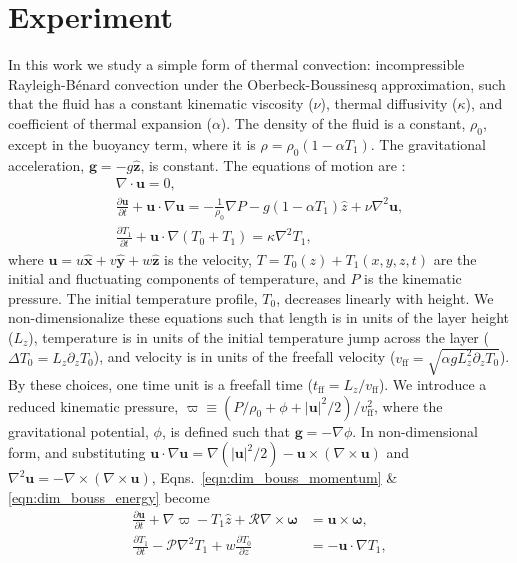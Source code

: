 \documentclass[aps, pre, onecolumn, nofootinbib, notitlepage, groupedaddress, amsfonts, amssymb, amsmath, longbibliography]{revtex4-1}
\newcommand{\DivU}{\ensuremath{\nabla\cdot\bm{u}}}
\newcommand{\grad}{\ensuremath{\nabla}}
\newcommand{\RB}{Rayleigh-B\'{e}nard }
\begin{document}
\section{Experiment}
\label{sec:experiment}
In this work we study a simple form of thermal convection:
incompressible \RB convection under the Oberbeck-Boussinesq approximation,
such that the fluid
has a constant kinematic viscosity ($\nu$), thermal diffusivity ($\kappa$), and coefficient
of thermal expansion ($\alpha$). The density of the fluid is a constant, $\rho_0$,
except in the buoyancy term, where it is $\rho = \rho_0(1  - \alpha T_1)$.
The gravitational acceleration, $\bm{g} = - g\bm{\hat{z}}$, is constant.
The equations of motion are \cite{spiegel&veronis1960}:
\begin{gather}
\DivU = 0, 
	\label{eqn:incompressible}
\\
\frac{\partial \bm{u}}{\partial t} + \bm{u}\cdot\grad\bm{u} =
-\frac{1}{\rho_0}\grad P - g( 1 - \alpha T_1)\hat{z} + \nu\grad^2\bm{u}, 
	\label{eqn:dim_bouss_momentum}
\\
\frac{\partial T_1}{\partial t} + \bm{u}\cdot\grad(T_0 + T_1) = \kappa\grad^2 T_1,
	\label{eqn:dim_bouss_energy}
\end{gather}
where $\bm{u} = u\bm{\hat{x}} + v\bm{\hat{y}} + w\bm{\hat{z}}$ is the velocity, 
$T = T_0(z) + T_1(x, y, z, t)$ are the initial and fluctuating components of temperature, 
and $P$ is the kinematic pressure. The initial temperature profile, $T_0$, decreases
linearly with height.
We non-dimensionalize these equations such that
length is in units of the layer height ($L_z$),
temperature is in units of the initial temperature jump across the layer ($\Delta T_0 = L_z \partial_z T_0$), 
and velocity is in units of the freefall velocity ($v_{\text{ff}} = \sqrt{\alpha g L_z^2 \partial_z T_0}$).
By these choices, one time unit is a freefall time ($t_{\text{ff}} = L_z/v_{\text{ff}}$).
We introduce a reduced kinematic pressure,
$\varpi \equiv (P / \rho_0 + \phi + |\bm{u}|^2 / 2) / v_{\text{ff}}^2$, where the gravitational
potential, $\phi$, is defined such that $\bm{g} = -\grad \phi$. 
In non-dimensional form, and substituting 
$\bm{u}\cdot\grad\bm{u} = \grad(|\bm{u}|^2/2) - \bm{u}\times(\grad\times\bm{u})$
and $\grad^2\bm{u} = -\grad\times(\grad\times\bm{u})$, Eqns.~\ref{eqn:dim_bouss_momentum} \& \ref{eqn:dim_bouss_energy}
become
\begin{align}
\frac{\partial \bm{u}}{\partial t} + \grad \varpi - T_1\hat{z} + \mathcal{R}\grad\times\bm{\omega} &= \bm{u}\times\bm{\omega},
	\label{eqn:bouss_momentum}
\\
\frac{\partial T_1}{\partial t} - \mathcal{P}\grad^2 T_1 + w \frac{\partial T_0}{\partial z} &= - \bm{u}\cdot\grad T_1,
	\label{eqn:bouss_energy}
\end{align}
\end{document}
